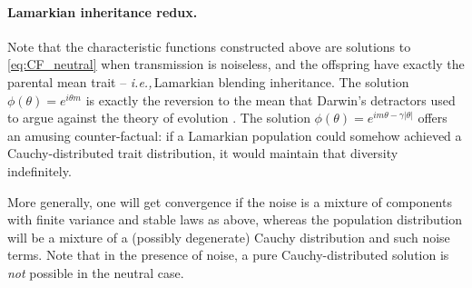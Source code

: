 \documentclass{article}
\newcommand{\ie}{\textit{i.e.,}\,}
\newcommand{\eg}{\textit{e.g.,}\,}
\newcommand{\1}{\mathbbm{1}}
\theoremstyle{remark}
\theoremstyle{definition}
\begin{document}
\paragraph{Lamarkian inheritance redux.} 
Note that the characteristic functions constructed above are solutions to \eqref{eq:CF_neutral} when transmission is noiseless, and the offspring have exactly the parental mean trait -- \ie Lamarkian blending inheritance.  The solution $\phi(\theta) = e^{i\theta m}$ is exactly the reversion to the mean that Darwin's detractors used to argue against the theory of evolution \citep{Provine1971}.  The solution $\phi(\theta) = e^{im \theta -\gamma|\theta|}$ offers an amusing counter-factual: if a Lamarkian population could somehow achieved a Cauchy-distributed trait distribution, it would maintain that diversity indefinitely.  




More generally, one will get convergence if the noise is a mixture of components with finite variance and stable laws as above, whereas the population distribution will be a mixture of a (possibly degenerate) Cauchy distribution and such noise terms. Note that in the presence of noise, a pure Cauchy-distributed solution is \emph{not} possible in the neutral case.
\end{document}
